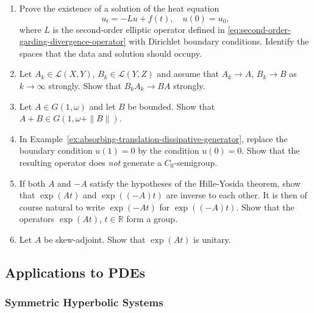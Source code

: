 \begin{enumerate}[label=\thesection.\arabic*.,ref=\thesection.\arabic*,start=9,series=book-problems]

\item\label{ex:hille-yosida-heat-dirichlet-existence} Prove the existence of a solution of the heat equation\[u_t=-Lu+f(t),\quad u(0)=u_0,\]where $L$ is the second-order elliptic operator defined in \eqref{eq:second-order-garding-divergence-operator} with Dirichlet boundary conditions. Identify the spaces that the data and solution should occupy.

\item\label{ex:strong-operator-products-converge} Let $A_k\in\mathcal{L}(X,Y)$, $B_k\in\mathcal{L}(Y,Z)$ and assume that $A_k\to A$, $B_k\to B$ as $k\to\infty$ strongly. Show that $B_kA_k\to BA$ strongly.

\item\label{ex:quasicontraction-bounded-operator-perturbation} Let $A\in G(1,\omega)$ and let $B$ be bounded. Show that $A+B\in G(1,\omega+\|B\|)$.

\item\label{ex:translation-opposite-boundary-not-generator} In Example~\ref{ex:absorbing-translation-dissipative-generator}, replace the boundary condition $u(1)=0$ by the condition $u(0)=0$. Show that the resulting operator does \emph{not} generate a $C_0$-semigroup.

\item\label{ex:opposite-generators-inverse-semigroup-group} If both $A$ and $-A$ satisfy the hypotheses of the Hille-Yosida theorem, show that $\exp(At)$ and $\exp((-A)t)$ are inverse to each other. It is then of course natural to write $\exp(-At)$ for $\exp((-A)t)$. Show that the operators $\exp(At)$, $t\in\mathbb{R}$ form a group.

\item\label{ex:skew-adjoint-semigroup-unitary} Let $A$ be skew-adjoint. Show that $\exp(At)$ is unitary.

\end{enumerate}

\subsection{Applications to PDEs}\label{sec:semigroup-pde-applications}

\subsubsection{Symmetric Hyperbolic Systems}\label{subsec:semigroup-symmetric-hyperbolic-systems}

